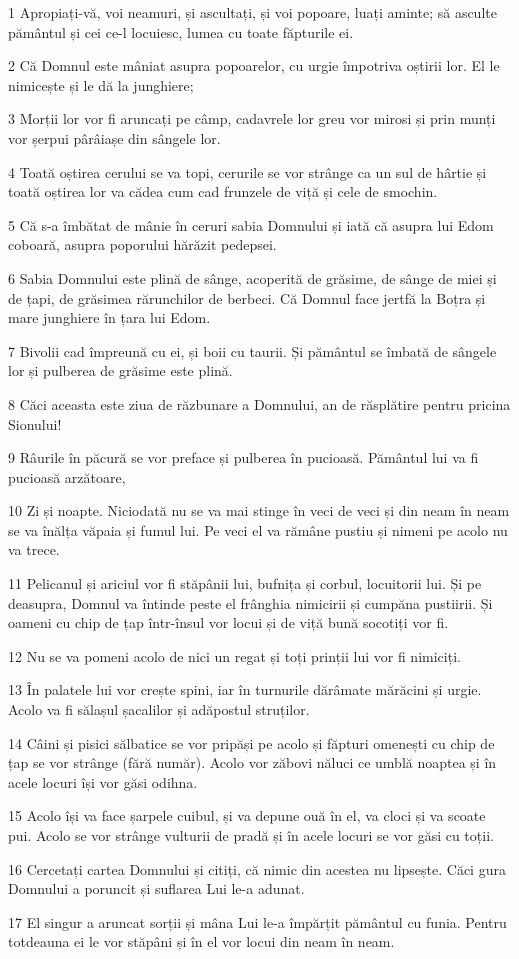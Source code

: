 \par 1 Apropiați-vă, voi neamuri, și ascultați, și voi popoare, luați aminte; să asculte pământul și cei ce-l locuiesc, lumea cu toate făpturile ei.
\par 2 Că Domnul este mâniat asupra popoarelor, cu urgie împotriva oștirii lor. El le nimicește și le dă la junghiere;
\par 3 Morții lor vor fi aruncați pe câmp, cadavrele lor greu vor mirosi și prin munți vor șerpui pârâiașe din sângele lor.
\par 4 Toată oștirea cerului se va topi, cerurile se vor strânge ca un sul de hârtie și toată oștirea lor va cădea cum cad frunzele de viță și cele de smochin.
\par 5 Că s-a îmbătat de mânie în ceruri sabia Domnului și iată că asupra lui Edom coboară, asupra poporului hărăzit pedepsei.
\par 6 Sabia Domnului este plină de sânge, acoperită de grăsime, de sânge de miei și de țapi, de grăsimea rărunchilor de berbeci. Că Domnul face jertfă la Boțra și mare junghiere în țara lui Edom.
\par 7 Bivolii cad împreună cu ei, și boii cu taurii. Și pământul se îmbată de sângele lor și pulberea de grăsime este plină.
\par 8 Căci aceasta este ziua de răzbunare a Domnului, an de răsplătire pentru pricina Sionului!
\par 9 Râurile în păcură se vor preface și pulberea în pucioasă. Pământul lui va fi pucioasă arzătoare,
\par 10 Zi și noapte. Niciodată nu se va mai stinge în veci de veci și din neam în neam se va înălța văpaia și fumul lui. Pe veci el va rămâne pustiu și nimeni pe acolo nu va trece.
\par 11 Pelicanul și ariciul vor fi stăpânii lui, bufnița și corbul, locuitorii lui. Și pe deasupra, Domnul va întinde peste el frânghia nimicirii și cumpăna pustiirii. Și oameni cu chip de țap într-însul vor locui și de viță bună socotiți vor fi.
\par 12 Nu se va pomeni acolo de nici un regat și toți prinții lui vor fi nimiciți.
\par 13 În palatele lui vor crește spini, iar în turnurile dărâmate mărăcini și urgie. Acolo va fi sălașul șacalilor și adăpostul struților.
\par 14 Câini și pisici sălbatice se vor pripăși pe acolo și făpturi omenești cu chip de țap se vor strânge (fără număr). Acolo vor zăbovi năluci ce umblă noaptea și în acele locuri își vor găsi odihna.
\par 15 Acolo își va face șarpele cuibul, și va depune ouă în el, va cloci și va scoate pui. Acolo se vor strânge vulturii de pradă și în acele locuri se vor găsi cu toții.
\par 16 Cercetați cartea Domnului și citiți, că nimic din acestea nu lipsește. Căci gura Domnului a poruncit și suflarea Lui le-a adunat.
\par 17 El singur a aruncat sorții și mâna Lui le-a împărțit pământul cu funia. Pentru totdeauna ei le vor stăpâni și în el vor locui din neam în neam.

